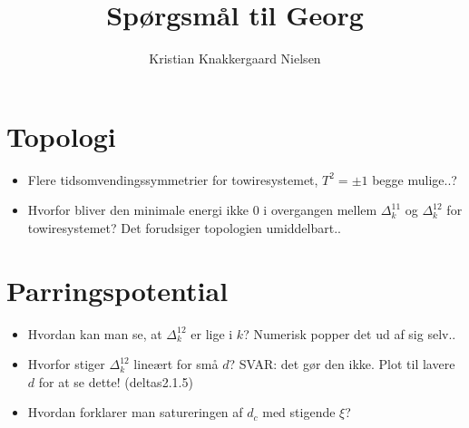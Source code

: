 \documentclass[10pt]{article}
\title{Spørgsmål til Georg}
\author{Kristian Knakkergaard Nielsen}
\begin{document}
\maketitle
\section{Topologi}
\begin{itemize}
\item Flere tidsomvendingssymmetrier for towiresystemet, $T^2 = \pm 1$ begge mulige..?
\item Hvorfor bliver den minimale energi ikke 0 i overgangen mellem $\Delta^{11}_k$ og $\Delta^{12}_k$ for towiresystemet? Det forudsiger topologien umiddelbart.. 
\end{itemize}

\section{Parringspotential}
\begin{itemize}
\item Hvordan kan man se, at $\Delta^{12}_k$ er lige i $k$? Numerisk popper det ud af sig selv..
\item Hvorfor stiger $\Delta^{12}_k$ lineært for små $d$? SVAR: det gør den ikke. Plot til lavere $d$ for at se dette! (deltas2.1.5)
\item Hvordan forklarer man satureringen af $d_c$ med stigende $\xi$? 
\end{itemize}
\end{document}
